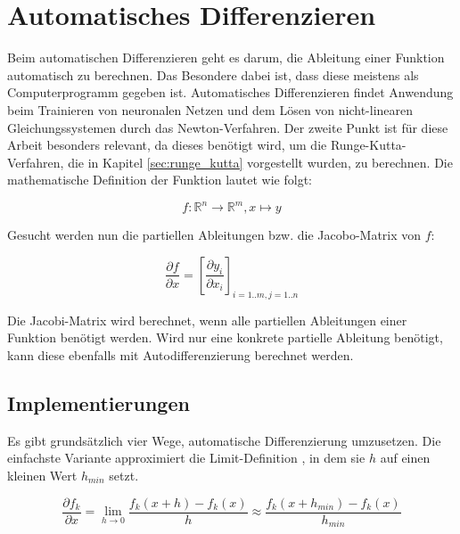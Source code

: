 
\section{Automatisches Differenzieren} \label{sec:auto_diffentiation}

Beim automatischen Differenzieren \cite[Kapitel~2]{autodiff} geht es darum, die Ableitung einer Funktion automatisch zu berechnen.
Das Besondere dabei ist, dass diese meistens als Computerprogramm gegeben ist.
Automatisches Differenzieren findet Anwendung beim Trainieren von neuronalen Netzen 
und dem Lösen von nicht-linearen Gleichungssystemen durch das Newton-Verfahren.
Der zweite Punkt ist für diese Arbeit besonders relevant, da 
dieses benötigt wird, um die Runge-Kutta-Verfahren, die in Kapitel \ref{sec:runge_kutta} vorgestellt wurden, zu berechnen.
Die mathematische Definition der Funktion lautet wie folgt:

$$
f: \mathbb{R}^n \rightarrow \mathbb{R}^m, x \mapsto y
$$

Gesucht werden nun die partiellen Ableitungen bzw. die Jacobo-Matrix von $f$:

$$
\frac{\partial f}{\partial x} = \left[ \frac{\partial y_i}{\partial x_i} \right]_{i=1..m, j=1..n} 
$$

Die Jacobi-Matrix wird berechnet, wenn alle partiellen Ableitungen einer Funktion benötigt werden.
Wird nur eine konkrete partielle Ableitung benötigt, kann diese ebenfalls mit Autodifferenzierung berechnet werden.

\subsection{Implementierungen} \label{sec:implementation}

Es gibt grundsätzlich vier Wege, automatische Differenzierung umzusetzen.
Die einfachste Variante approximiert die Limit-Definition \cite[Kapitel~2.8]{fund_cal}, in dem sie $h$ auf einen kleinen Wert
$h_{min}$ setzt.


$$
\frac{\partial f_k}{\partial x} = \lim_{h \to 0} \frac{f_k(x+ h) - f_k(x)}{h} \approx \frac{f_k(x + h_{min}) - f_k(x)}{h_{min}} 
$$

